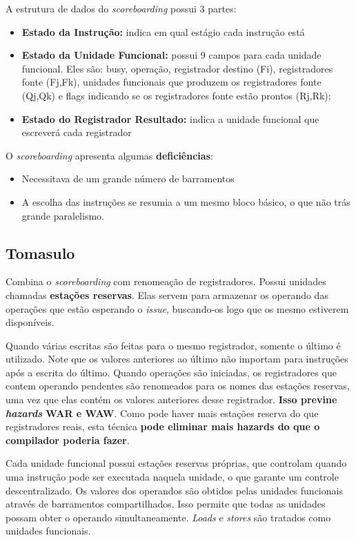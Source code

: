 A estrutura de dados do \textit{scoreboarding} possui 3 partes:
\begin{itemize}
  \item \textbf{Estado da Instrução:} indica em qual estágio cada instrução está

  \item \textbf{Estado da Unidade Funcional:} possui 9 campos para cada unidade funcional. Eles são: busy, operação, registrador destino (Fi), registradores fonte (Fj,Fk), unidades funcionais que produzem os registradores fonte (Qj,Qk) e flags indicando se os registradores fonte estão prontos (Rj,Rk);

  \item \textbf{Estado do Registrador Resultado:} indica a unidade funcional que escreverá cada registrador
\end{itemize}

O \textit{scoreboarding} apresenta algumas \textbf{deficiências}:
\begin{itemize}
  \item Necessitava de um grande número de barramentos

  \item A escolha das instruções se resumia a um mesmo bloco básico, o que não trás grande paralelismo.
\end{itemize}




\subsection{Tomasulo}
Combina o \textit{scoreboarding} com renomeação de registradores. Possui unidades chamadas \textbf{estações reservas}. Elas servem para armazenar os operando das operações que estão esperando o \textit{issue}, buscando-os logo que os mesmo estiverem disponíveis.

Quando várias escritas são feitas para o mesmo registrador, somente o último é utilizado. Note que os valores anteriores ao último não importam para instruções após a escrita do último. Quando operações são iniciadas, os registradores que contem operando pendentes são renomeados para os nomes das estações reservas, uma vez que elas contém os valores anteriores desse registrador. \textbf{Isso previne \textit{hazards} WAR e WAW}. Como pode haver mais estações reserva do que registradores reais, esta técnica \textbf{pode eliminar mais hazards do que o compilador poderia fazer}.

Cada unidade funcional possui estações reservas próprias, que controlam quando uma instrução pode ser executada naquela unidade, o que garante um controle descentralizado. Os valores dos operandos são obtidos pelas unidades funcionais através de barramentos compartilhados. Isso permite que todas as unidades possam obter o operando simultaneamente. \textit{Loads} e \textit{stores} são tratados como unidades funcionais.

